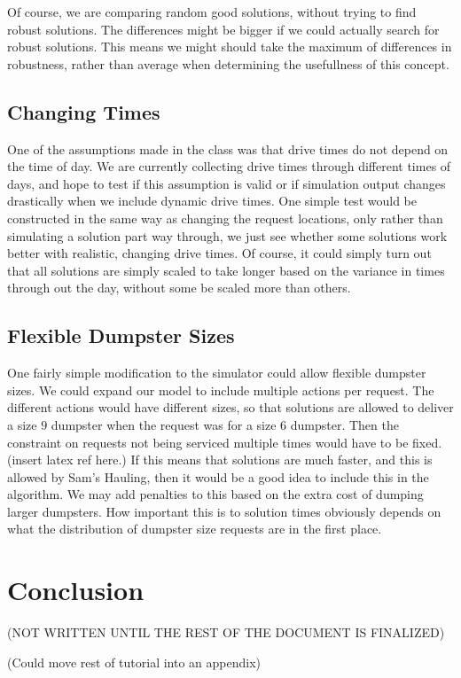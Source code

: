 \documentclass{article}
\begin{document}
Of course, we are comparing random good solutions, without trying to find robust solutions.
The differences might be bigger if we could actually search for robust solutions.
This means we might should take the maximum of differences in robustness, rather than average when determining the usefullness of this concept.


\subsection{Changing Times}
One of the assumptions made in the class was that drive times do not depend on the time of day.
We are currently collecting drive times through different times of days, and hope to test if this assumption is valid or if simulation output changes drastically when we include dynamic drive times.
One simple test would be constructed in the same way as changing the request locations, only rather than simulating a solution part way through, we just see whether some solutions work better with realistic, changing drive times.
Of course, it could simply turn out that all solutions are simply scaled to take longer based on the variance in times through out the day, without some be scaled more than others.

\subsection{Flexible Dumpster Sizes}
One fairly simple modification to the simulator could allow flexible dumpster sizes.
We could expand our model to include multiple actions per request.
The different actions would have different sizes, so that solutions are allowed to deliver a size $9$ dumpster when the request was for a size $6$ dumpster.
Then the constraint on requests not being serviced multiple times would have to be fixed. (insert latex ref here.)
If this means that solutions are much faster, and this is allowed by Sam's Hauling, then it would be a good idea to include this in the algorithm.
We may add penalties to this based on the extra cost of dumping larger dumpsters.
How important this is to solution times obviously depends on what the distribution of dumpster size requests are in the first place.

\section{Conclusion}

(NOT WRITTEN UNTIL THE REST OF THE DOCUMENT IS FINALIZED)


(Could move rest of tutorial into an appendix)
\end{document}
